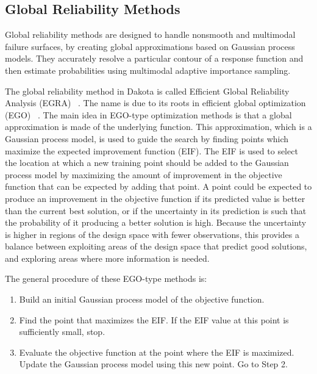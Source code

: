 \subsection{Global Reliability Methods}\label{uq:reliability:global}

Global reliability methods are designed to handle nonsmooth and
multimodal failure surfaces, by creating global approximations based
on Gaussian process models. They accurately resolve a particular
contour of a response function and then estimate probabilities using
multimodal adaptive importance sampling.

The global reliability method in Dakota is called 
Efficient Global Reliability Analysis (EGRA) ~\cite{Bichon2008}. 
The name is due to its 
roots in efficient global optimization (EGO) ~\cite{Jon98,Hua06}.
The main idea in EGO-type optimization methods is that a global 
approximation is made of the underlying function. This approximation, 
which is a Gaussian process model, is used to guide the search by finding 
points which maximize the expected improvement function (EIF). 
The EIF is used to select the location at which a new training point should be
added to the Gaussian process model by maximizing the amount of improvement 
in the objective function that can be expected by adding that point.
A point could be expected to produce an improvement in the objective function 
if its predicted value is better than the current best solution, or if the 
uncertainty in its prediction is such that the probability of it producing
a better solution is high.
Because the uncertainty is higher in regions of the design space with fewer
observations, this provides a balance between exploiting areas of the
design space that predict good solutions, and exploring areas where more
information is needed.

The general procedure of these EGO-type methods is:
\begin{enumerate}
\item Build an initial Gaussian process model of the objective function.
\item Find the point that maximizes the EIF.
      If the EIF value at this point is sufficiently small, stop.
\item Evaluate the objective function at the point where the EIF is maximized.
      Update the Gaussian process model using this new point.
      Go to Step 2.
\end{enumerate}


